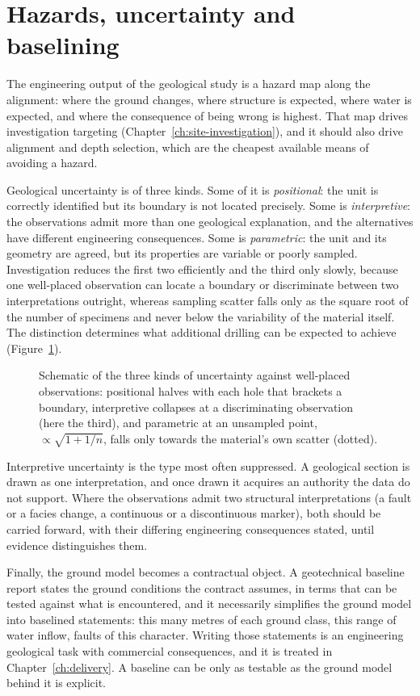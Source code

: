 \section{Hazards, uncertainty and baselining}
\label{sec:geological-hazards}

The engineering output of the geological study is a hazard map along the
alignment: where the ground changes, where structure is expected, where water
is expected, and where the consequence of being wrong is highest. That map
drives investigation targeting (Chapter~\ref{ch:site-investigation}), and it should also drive alignment and depth
selection, which are the cheapest available means of avoiding a hazard.

Geological uncertainty is of three kinds. Some of it is
\emph{positional}: the unit is correctly identified but its boundary is not
located precisely. Some is \emph{interpretive}: the observations admit more
than one geological explanation, and the alternatives have different
engineering consequences. Some is \emph{parametric}: the unit and its geometry
are agreed, but its properties are variable or poorly sampled. Investigation
reduces the first two efficiently and the third only slowly, because one
well-placed observation can locate a boundary or discriminate between two
interpretations outright, whereas sampling scatter falls only as the square
root of the number of specimens and never below the variability of the
material itself. The distinction determines what additional drilling can be
expected to achieve (Figure~\ref{fig:geo-uncertainty}).

\begin{figure}[htbp]
\centering
{}
\caption{Schematic of the three kinds of uncertainty against well-placed
observations: positional halves with each hole that brackets a boundary,
interpretive collapses at a discriminating observation (here the third), and
parametric at an unsampled point, $\propto\sqrt{1 + 1/n}$, falls only towards
the material's own scatter (dotted).}
\label{fig:geo-uncertainty}
\end{figure}

Interpretive uncertainty is the type most often suppressed. A geological section is drawn as one interpretation,
and once drawn it acquires an authority the data do not support. Where the
observations admit two structural interpretations (a fault or a
facies change, a continuous or a discontinuous marker), both should be
carried forward, with their differing engineering consequences stated, until
evidence distinguishes them.

Finally, the ground model becomes a contractual object. A geotechnical
baseline report states the ground conditions the contract assumes, in terms
that can be tested against what is encountered, and it necessarily
simplifies the ground model into baselined statements: this many
metres of each ground class, this range of water inflow, faults of this
character. Writing those statements is an engineering geological task with
commercial consequences, and it is treated in
Chapter~\ref{ch:delivery}. A baseline can be only as testable as the
ground model behind it is explicit.

\chapterreferences
